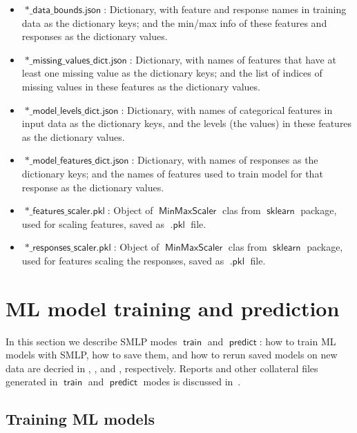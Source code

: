 \documentclass[a4paper,parskip=half]{article} %
\newcommand*\option[1]{\operatorname{\mathsf{#1}}} %
\newcommand*\suffix[1]{\operatorname{\mathsf{#1}}} %
\newcommand*\mode[1]{\operatorname{\mathsf{#1}}} %
\newcommand*\package[1]{\operatorname{\mathsf{#1}}} %
\begin{document}
\begin{itemize}
\item $\suffix{*\_data\_bounds.json}$: Dictionary, with feature and response names in training data as the dictionary keys; 
and the min/max info of these features and responses as the dictionary values. 
\item $\suffix{*\_missing\_values\_dict.json}$: Dictionary, with names of features that have at least one missing value as the 
dictionary keys; and the list of indices of missing values in these features  as the dictionary values.
\item $\suffix{*\_model\_levels\_dict.json}$: Dictionary, with names of categorical features in input data as the dictionary 
keys, and the levels (the values) in these features as the dictionary values.
\item $\suffix{*\_model\_features\_dict.json}$: Dictionary, with names of responses as the dictionary keys; and the names of
features used to train model for that response as the dictionary values.
\item $\suffix{*\_features\_scaler.pkl}$: Object of $\option{MinMaxScaler}$ clas from $\package{sklearn}$ package, 
used for scaling features, saved as $\suffix{.pkl}$ file.
\item $\suffix{*\_responses\_scaler.pkl}$:  Object of $\option{MinMaxScaler}$ clas from $\package{sklearn}$ package, 
used for features scaling the responses, saved as $\suffix{.pkl}$ file. 
\end{itemize}



\section{ML model training and prediction}\label{sec:models}

In this section we describe SMLP modes $\mode{train}$ and $\mode{predict}$: 
how to train ML models with SMLP, how to save them, and how to rerun saved models on new data are decried 
in , , and , respectively. Reports and other 
collateral files generated in $\mode{train}$ and $\mode{predict}$ modes is discussed in~.


\subsection{Training ML models}\label{sec:models:train}
\end{document}
